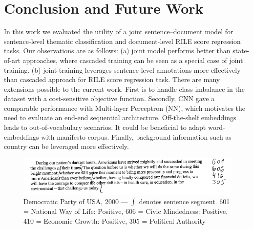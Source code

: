 \documentclass[11pt,a4paper]{article}
\begin{document}
\section{Conclusion and Future Work}
In this work we evaluated the utility of a joint sentence--document model for sentence-level thematic classification and document-level RILE score regression tasks. Our observations are as follows: (a) joint model performs better than state-of-art approaches, where cascaded training can be seen as a special case of joint training. (b) joint-training leverages sentence-level annotations more effectively than cascaded approach for RILE score regression task. There are many extensions possible to the current work. First is to handle class imbalance in the dataset with a cost-sensitive objective function. Secondly, CNN gave a comparable performance with Multi-layer Perceptron (NN), which motivates the need to evaluate an end-end sequential architecture. Off-the-shelf embeddings leads to out-of-vocabulary scenarios. It could be beneficial to  adapt word-embeddings with manifesto corpus. Finally, background information such as country can be leveraged more effectively.


\begin{figure}[t!]
\includegraphics[width=1\linewidth]{US_Democrats_1.png}
\caption{Democratic Party of USA, 2000 --- $\int$ denotes sentence segment. 601 = National Way of Life: Positive, 606 = Civic Mindedness: Positive, 410 = Economic Growth: Positive, 305 = Political Authority}
\label{fig:sub2}
\end{figure}

\end{document}
